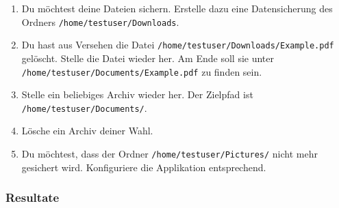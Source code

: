 \begin{enumerate}
\item Du möchtest deine Dateien sichern. Erstelle dazu eine Datensicherung des Ordners \texttt{/home/testuser/Downloads}.
\item Du hast aus Versehen die Datei \texttt{/home/testuser/Downloads/Example.pdf}
gelöscht. Stelle die Datei wieder her. Am Ende soll sie unter
\texttt{/home/testuser/Documents/Example.pdf} zu finden sein.
\item Stelle ein beliebiges Archiv wieder her. Der Zielpfad ist \texttt{/home/testuser/Documents/}.
\item Lösche ein Archiv deiner Wahl.
\item Du möchtest, dass der Ordner \texttt{/home/testuser/Pictures/} nicht mehr gesichert
wird. Konfiguriere die Applikation entsprechend.
\end{enumerate}

\newpage
\subsubsection{Resultate}
\label{sec:org18050af}

